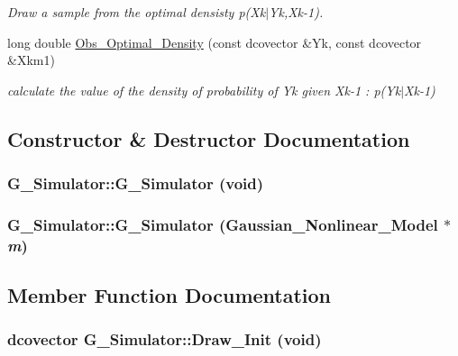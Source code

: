 \begin{CompactItemize}
\begin{CompactList}\small\item\em Draw a sample from the optimal densisty p(Xk$|$Yk,Xk-1). \item\end{CompactList}\item 
long double \hyperlink{class_g___simulator_192df25d6edac87bf4aeb2d2f55d1c5c}{Obs\_\-Optimal\_\-Density} (const dcovector \&Yk, const dcovector \&Xkm1)
\begin{CompactList}\small\item\em calculate the value of the density of probability of Yk given Xk-1 : p(Yk$|$Xk-1) \item\end{CompactList}\end{CompactItemize}


\subsection{Constructor \& Destructor Documentation}
\hypertarget{class_g___simulator_f73fe624aee09a345b153b9c2fe7a8a5}{
\subsubsection[{G\_\-Simulator}]{\setlength{\rightskip}{0pt plus 5cm}G\_\-Simulator::G\_\-Simulator (void)}}
\label{class_g___simulator_f73fe624aee09a345b153b9c2fe7a8a5}


\hypertarget{class_g___simulator_a42df6b23b83676a63e0afb6e765ea5e}{
\subsubsection[{G\_\-Simulator}]{\setlength{\rightskip}{0pt plus 5cm}G\_\-Simulator::G\_\-Simulator ({\bf Gaussian\_\-Nonlinear\_\-Model} $\ast$ {\em m})}}
\label{class_g___simulator_a42df6b23b83676a63e0afb6e765ea5e}




\subsection{Member Function Documentation}
\hypertarget{class_g___simulator_0e9a1d220c5457cc07c6bcdb70e1638c}{
\subsubsection[{Draw\_\-Init}]{\setlength{\rightskip}{0pt plus 5cm}dcovector G\_\-Simulator::Draw\_\-Init (void)}}
\label{class_g___simulator_0e9a1d220c5457cc07c6bcdb70e1638c}


